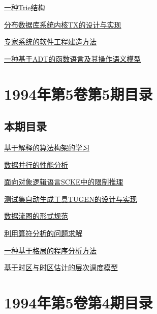 \documentclass[a4paper]{article}
\begin{document}
\href{http://www.jos.org.cn/ch/reader/download_pdf.aspx?file_no=19940607&year_id=1994&quarter_id=6&falg=1}{一种Trie结构}

\href{http://www.jos.org.cn/ch/reader/download_pdf.aspx?file_no=19940608&year_id=1994&quarter_id=6&falg=1}{分布数据库系统内核TX的设计与实现}

\href{http://www.jos.org.cn/ch/reader/download_pdf.aspx?file_no=19940609&year_id=1994&quarter_id=6&falg=1}{专家系统的软件工程建造方法}

\href{http://www.jos.org.cn/ch/reader/download_pdf.aspx?file_no=19940610&year_id=1994&quarter_id=6&falg=1}{一种基于ADT的函数语言及其操作语义模型}


\section{\textbf{1994年第5卷第5期目录}}
\subsection{本期目录}
\href{http://www.jos.org.cn/ch/reader/download_pdf.aspx?file_no=19940501&year_id=1994&quarter_id=5&falg=1}{基于解释的算法构架的学习}

\href{http://www.jos.org.cn/ch/reader/download_pdf.aspx?file_no=19940502&year_id=1994&quarter_id=5&falg=1}{数据并行的性能分析}

\href{http://www.jos.org.cn/ch/reader/download_pdf.aspx?file_no=19940503&year_id=1994&quarter_id=5&falg=1}{面向对象逻辑语言SCKE中的限制推理}

\href{http://www.jos.org.cn/ch/reader/download_pdf.aspx?file_no=19940504&year_id=1994&quarter_id=5&falg=1}{测试集自动生成工具TUGEN的设计与实现}

\href{http://www.jos.org.cn/ch/reader/download_pdf.aspx?file_no=19940505&year_id=1994&quarter_id=5&falg=1}{数据流图的形式规范}

\href{http://www.jos.org.cn/ch/reader/download_pdf.aspx?file_no=19940506&year_id=1994&quarter_id=5&falg=1}{利用算符分析的问题求解}

\href{http://www.jos.org.cn/ch/reader/download_pdf.aspx?file_no=19940507&year_id=1994&quarter_id=5&falg=1}{一种基于格局的程序分析方法}

\href{http://www.jos.org.cn/ch/reader/download_pdf.aspx?file_no=19940508&year_id=1994&quarter_id=5&falg=1}{基于时区与时区估计的层次调度模型}


\section{\textbf{1994年第5卷第4期目录}}
\end{document}

